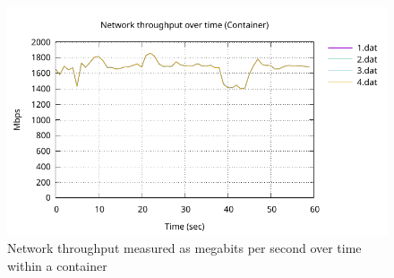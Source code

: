 \begin{figure}[H]
    \centering
    \includegraphics[width=1\textwidth]{images/results/network-throughput-container.pdf}
    \caption{Network throughput measured as megabits per second over time within a container}
    \label{ticket-builder-class}
\end{figure}